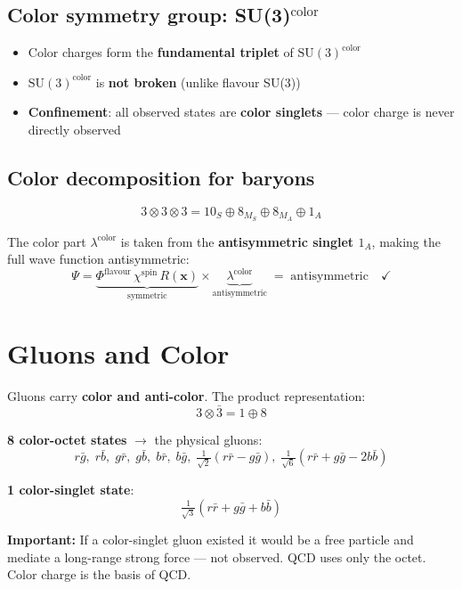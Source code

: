 \documentclass[11pt,a4paper]{article}
\newenvironment{notebox}{%
  \par\vspace{4pt}
  \noindent\small\color{notegray}%
}{\par\vspace{4pt}}
\newcommand{\keyword}[1]{\textbf{#1}}
\begin{document}
\subsection{Color symmetry group: SU(3)$^{\mathrm{color}}$}

\begin{itemize}
  \item Color charges form the \textbf{fundamental triplet} of $\mathrm{SU}(3)^{\mathrm{color}}$
  \item $\mathrm{SU}(3)^{\mathrm{color}}$ is \textbf{not broken} (unlike flavour SU(3))
  \item \keyword{Confinement}: all observed states are \textbf{color singlets}
        --- color charge is never directly observed
\end{itemize}

\subsection{Color decomposition for baryons}

\[
  3 \otimes 3 \otimes 3 = 10_S \oplus 8_{M_S} \oplus 8_{M_A} \oplus 1_A
\]

The color part $\lambda^{\mathrm{color}}$ is taken from the \textbf{antisymmetric singlet
$1_A$}, making the full wave function antisymmetric:
\[
  \Psi
  = \underbrace{\Phi^{\mathrm{flavour}}\, \chi^{\mathrm{spin}}\, R(\mathbf{x})}_{\text{symmetric}}
    \times
    \underbrace{\lambda^{\mathrm{color}}}_{\text{antisymmetric}}
  \;=\; \text{antisymmetric} \quad \checkmark
\]

\section{Gluons and Color}

Gluons carry \keyword{color and anti-color}. The product representation:
\[
  3 \otimes \bar{3} = 1 \oplus 8
\]

\textbf{8 color-octet states} $\to$ the physical gluons:
\[
  r\bar{g},\; r\bar{b},\; g\bar{r},\; g\bar{b},\; b\bar{r},\; b\bar{g},\;
  \tfrac{1}{\sqrt{2}}(r\bar{r}-g\bar{g}),\;
  \tfrac{1}{\sqrt{6}}(r\bar{r}+g\bar{g}-2b\bar{b})
\]

\textbf{1 color-singlet state}:
\[
  \tfrac{1}{\sqrt{3}}(r\bar{r}+g\bar{g}+b\bar{b})
\]

\begin{notebox}
  \textbf{Important:} If a color-singlet gluon existed it would be a free particle and
  mediate a long-range strong force --- not observed. QCD uses only the octet.
  Color charge is the basis of QCD.
\end{notebox}
\end{document}
